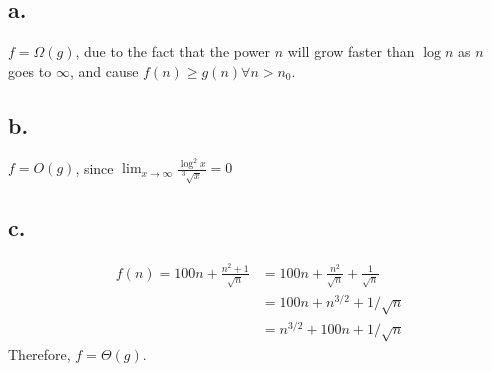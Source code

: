 \documentclass[14pt, letterpaper]{article}
\begin{document}
\subsection{a.}
$f = \Omega(g)$, due to the fact that the power $n$ will grow faster than
$\log n$ as $n$ goes to $\infty$, and cause $f(n) \geq g(n) \forall n > n_0$.

\subsection{b.}
$f = O(g)$, since $\displaystyle \lim_{x \to \infty} \frac{\log^2 x}{^3\sqrt x} = 0$

\subsection{c.}
\begin{equation}
	\begin{split}
		f(n) = 100n + \frac{n^2 + 1}{\sqrt n} & = 100n + \frac{n^2}{\sqrt n} + \frac{1}{\sqrt n} \\
		& = 100n + n^{3/2} + 1/{\sqrt n} \\
		& = n^{3/2} + 100n + 1/{\sqrt n}
	\end{split}
\end{equation}
Therefore, $f = \Theta(g)$.
\end{document}
